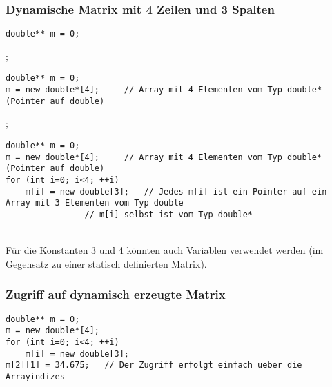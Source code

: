 \subsubsection{Dynamische Matrix mit 4 Zeilen und 3 Spalten\hfill}
\label{sec:Dynamische Matrix mit 4 Zeilen und 3 Spalten}
\noindent
\begin{minipage}{\linewidth}
\begin{lstlisting}
double** m = 0;
\end{lstlisting}
\end{minipage}
\begin{figure}[h]
	\centering
	
\end{figure}
\vspace{5mm};
\noindent
\begin{minipage}{\linewidth}
\begin{lstlisting}
double** m = 0;
m = new double*[4];		// Array mit 4 Elementen vom Typ double* (Pointer auf double)
\end{lstlisting}
\end{minipage}
\begin{figure}[h]
	\centering
	
\end{figure}
\vspace{5mm};
\noindent
\begin{minipage}{\linewidth}
\begin{lstlisting}
double** m = 0;
m = new double*[4];		// Array mit 4 Elementen vom Typ double* (Pointer auf double)
for (int i=0; i<4; ++i)	
	m[i] = new double[3];	// Jedes m[i] ist ein Pointer auf ein Array mit 3 Elementen vom Typ double
				// m[i] selbst ist vom Typ double*	
\end{lstlisting}
\end{minipage}
\begin{figure}[hh]
	\centering
	
\end{figure}
\\
Für die Konstanten 3 und 4 könnten auch Variablen verwendet werden (im Gegensatz zu einer statisch definierten Matrix).

\subsubsection{Zugriff auf dynamisch erzeugte Matrix\hfill}
\label{sec:Zugriff auf dynamisch erzeugte Matrix}
\noindent
\begin{minipage}{\linewidth}
\begin{lstlisting}
double** m = 0;
m = new double*[4];
for (int i=0; i<4; ++i)	
	m[i] = new double[3];	
m[2][1] = 34.675;	// Der Zugriff erfolgt einfach ueber die Arrayindizes	
\end{lstlisting}
\end{minipage}
\begin{figure}[hh]
	\centering
	
\end{figure}
\vspace{1cm}
\\

